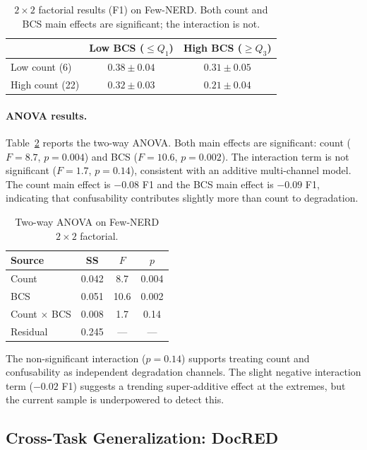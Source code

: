 \documentclass[11pt,a4paper]{article}
\begin{document}
\begin{table}[t]
\centering
\caption{$2 \times 2$ factorial results (F1) on Few-NERD. Both count and BCS main effects are significant; the interaction is not.}
\label{tab:factorial}
\begin{tabular}{lcc}
\toprule
& \textbf{Low BCS ($\leq Q_1$)} & \textbf{High BCS ($\geq Q_3$)} \\
\midrule
Low count (6)  & $0.38 \pm 0.04$ & $0.31 \pm 0.05$ \\
High count (22) & $0.32 \pm 0.03$ & $0.21 \pm 0.04$ \\
\bottomrule
\end{tabular}
\end{table}

\paragraph{ANOVA results.}
Table~\ref{tab:anova} reports the two-way ANOVA. Both main effects are significant: count ($F=8.7$, $p=0.004$) and BCS ($F=10.6$, $p=0.002$). The interaction term is not significant ($F=1.7$, $p=0.14$), consistent with an additive multi-channel model. The count main effect is $-0.08$ F1 and the BCS main effect is $-0.09$ F1, indicating that confusability contributes slightly more than count to degradation.

\begin{table}[t]
\centering
\caption{Two-way ANOVA on Few-NERD $2 \times 2$ factorial.}
\label{tab:anova}
\begin{tabular}{lccc}
\toprule
\textbf{Source} & \textbf{SS} & \textbf{$F$} & \textbf{$p$} \\
\midrule
Count         & 0.042 & 8.7  & 0.004 \\
BCS           & 0.051 & 10.6 & 0.002 \\
Count $\times$ BCS & 0.008 & 1.7  & 0.14 \\
Residual      & 0.245 & ---  & --- \\
\bottomrule
\end{tabular}
\end{table}

The non-significant interaction ($p=0.14$) supports treating count and confusability as independent degradation channels. The slight negative interaction term ($-0.02$ F1) suggests a trending super-additive effect at the extremes, but the current sample is underpowered to detect this.

\subsection{Cross-Task Generalization: DocRED}
\label{sec:docred}
\end{document}
